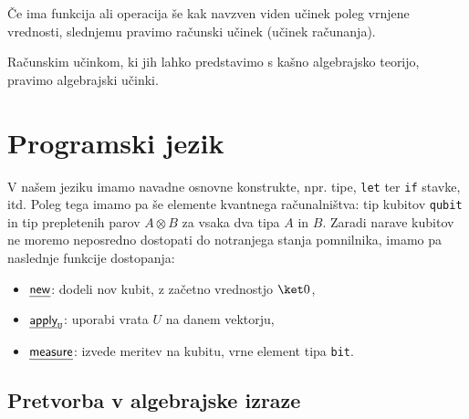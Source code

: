 \documentclass[a4paper,slovene]{article}
\begin{document}
\begin{definition}
    Če ima funkcija ali operacija še kak navzven viden učinek poleg vrnjene vrednosti, slednjemu pravimo računski učinek (učinek računanja).
\end{definition}

\begin{definition}
    Računskim učinkom, ki jih lahko predstavimo s kašno algebrajsko teorijo, pravimo algebrajski učinki.
\end{definition}

\section{Programski jezik}

V našem jeziku\cite{algeff-lin-qpl} imamo navadne osnovne konstrukte,
npr. tipe, \texttt{let} ter \texttt{if} stavke, itd.
Poleg tega imamo pa še elemente kvantnega računalništva:
tip kubitov \texttt{qubit} in tip prepletenih parov \( A⊗B \) za vsaka dva tipa \(A\) in \(B\).
Zaradi narave kubitov ne moremo neposredno dostopati do notranjega stanja pomnilnika,
imamo pa naslednje funkcije dostopanja:
\begin{itemize}
    \item \(\eff{new}\): dodeli nov kubit, z začetno vrednostjo \(\ket 0\),
    \item \(\eff{apply}_{\g U}\): uporabi vrata \(U\) na danem vektorju,
    \item \(\eff{measure}\): izvede meritev na kubitu, vrne element tipa \texttt{bit}.
\end{itemize}


\subsection{Pretvorba v algebrajske izraze}
\end{document}
